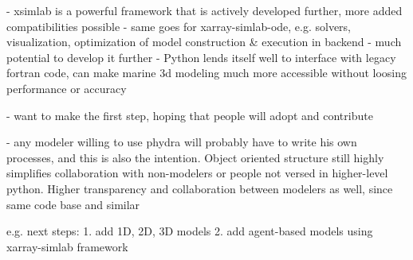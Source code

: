 \documentclass[journal abbreviation, manuscript]{copernicus}
\begin{document}
- xsimlab is a powerful framework that is actively developed further, more added compatibilities possible
- same goes for xarray-simlab-ode, e.g. solvers, visualization, optimization of model construction \& execution in backend - much potential to develop it further
- Python lends itself well to interface with legacy fortran code, can make marine 3d modeling much more accessible without loosing performance or accuracy

- want to make the first step, hoping that people will adopt and contribute

- any modeler willing to use phydra will probably have to write his own processes, and this is also the intention. Object oriented structure still highly simplifies collaboration with non-modelers or people not versed in higher-level python. Higher transparency and collaboration between modelers as well, since same code base and similar 

e.g. next steps: 1. add 1D, 2D, 3D models 2. add agent-based models using xarray-simlab framework























\appendix
\section{}    %
\end{document}
